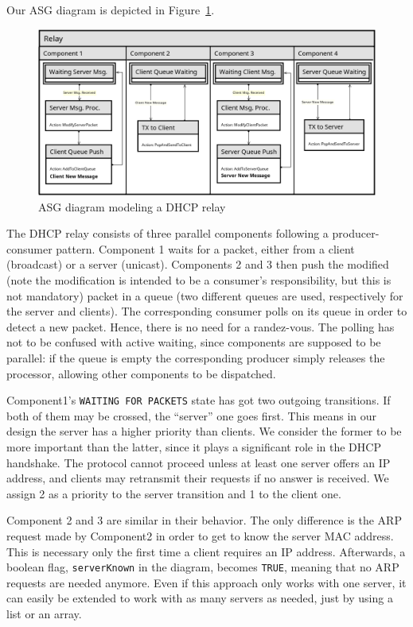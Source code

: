 Our ASG diagram is depicted in Figure~\ref{fig:asg}.
\begin{figure}[h]
	\centering\includegraphics[scale=0.5]{images/asg-diagram}
	\caption{ASG diagram modeling a DHCP relay}
	\label{fig:asg}
\end{figure}

The DHCP relay consists of three parallel components following a producer-consumer pattern. Component 1 waits for a packet, either from a client (broadcast) or a server (unicast). Components 2 and 3 then push the modified (note the modification is intended to be a consumer's responsibility, but this is not mandatory) packet in a queue (two different queues are used, respectively for the server and clients). The corresponding consumer polls on its queue in order to detect a new packet. Hence, there is no need for a randez-vous. The polling has not to be confused with active waiting, since components are supposed to be parallel: if the queue is empty the corresponding producer simply releases the processor, allowing other components to be dispatched.

Component1's \texttt{WAITING FOR PACKETS} state has got two outgoing transitions. If both of them may be crossed, the ``server'' one goes first. This means in our design the server has a higher priority than clients. We consider the former to be more important than the latter, since it plays a significant role in the DHCP handshake. The protocol cannot proceed unless at least one server offers an IP address, and clients may retransmit their requests if no answer is received. We assign 2 as a priority to the server transition and 1 to the client one.

Component 2 and 3 are similar in their behavior. The only difference is the ARP request made by Component2 in order to get to know the server MAC address. This is necessary only the first time a client requires an IP address. Afterwards, a boolean flag, \texttt{serverKnown} in the diagram, becomes \texttt{TRUE}, meaning that no ARP requests are needed anymore. Even if this approach only works with one server, it can easily be extended to work with as many servers as needed, just by using a list or an array.

